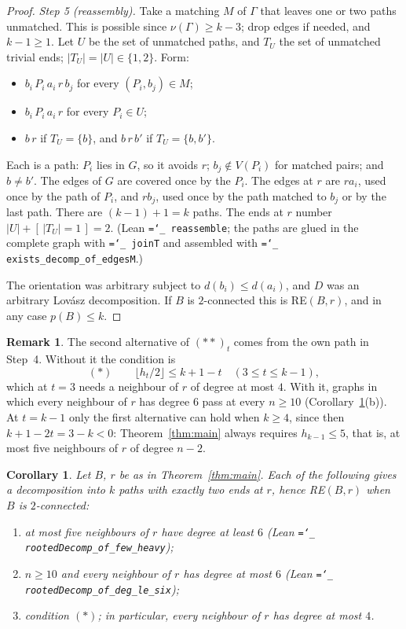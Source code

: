 \documentclass[11pt]{amsart}
\newtheorem{corollary}[theorem]{Corollary}
\theoremstyle{definition}
\newtheorem{remark}[theorem]{Remark}
\newcommand{\lean}[1]{\texttt{\hyphenchar\font=`\_ #1}}
\begin{document}
\begin{proof}
\emph{Step 5 (reassembly).} Take a matching $M$ of $\Gamma$ that leaves one or two paths unmatched.
This is possible since $\nu(\Gamma)\ge k-3$; drop edges if needed, and $k-1\ge1$. Let $U$ be the set of
unmatched paths, and $T_U$ the set of unmatched trivial ends; $|T_U|=|U|\in\{1,2\}$. Form:
\begin{itemize}[leftmargin=*]
\item $b_i\,P_i\,a_i\,r\,b_j$ for every $(P_i,b_j)\in M$;
\item $b_i\,P_i\,a_i\,r$ for every $P_i\in U$;
\item $b\,r$ if $T_U=\{b\}$, and $b\,r\,b'$ if $T_U=\{b,b'\}$.
\end{itemize}
Each is a path: $P_i$ lies in $G$, so it avoids $r$; $b_j\notin V(P_i)$ for matched pairs; and $b\ne b'$.
The edges of $G$ are covered once by the $P_i$. The edges at $r$ are $ra_i$, used once by the path of
$P_i$, and $rb_j$, used once by the path matched to $b_j$ or by the last path. There are
$(k-1)+1=k$ paths. The ends at $r$ number $|U|+[\,|T_U|=1\,]=2$. (Lean \lean{reassemble}; the paths are
glued in the complete graph with \lean{joinT} and assembled with \lean{exists\_decomp\_of\_edgesM}.)

The orientation was arbitrary subject to $d(b_i)\le d(a_i)$, and $D$ was an arbitrary Lov\'asz
decomposition. If $B$ is $2$-connected this is RE$(B,r)$, and in any case $p(B)\le k$.
\end{proof}

\begin{remark}
The second alternative of $(\ast\ast)_t$ comes from the own path in Step~4. Without it the condition
is
\[
(\ast)\qquad \lfloor h_t/2\rfloor\le k+1-t\quad(3\le t\le k-1),
\]
which at $t=3$ needs a neighbour of $r$ of degree at most $4$. With it, graphs in which every neighbour
of $r$ has degree $6$ pass at every $n\ge10$ (Corollary~\ref{cor:main}(b)).
At $t=k-1$ only the first alternative can hold when $k\ge4$, since then $k+1-2t=3-k<0$:
Theorem~\ref{thm:main} always requires $h_{k-1}\le5$, that is, at most five neighbours of $r$ of degree
$n-2$.
\end{remark}

\begin{corollary}\label{cor:main}
Let $B$, $r$ be as in Theorem~\ref{thm:main}. Each of the following gives a decomposition into $k$
paths with exactly two ends at $r$, hence RE$(B,r)$ when $B$ is $2$-connected:
\begin{enumerate}[label=(\alph*)]
\item at most five neighbours of $r$ have degree at least $6$ (Lean \lean{rootedDecomp\_of\_few\_heavy});
\item $n\ge 10$ and every neighbour of $r$ has degree at most $6$ (Lean
\lean{rootedDecomp\_of\_deg\_le\_six});
\item condition $(\ast)$; in particular, every neighbour of $r$ has degree at most $4$.
\end{enumerate}
\end{corollary}
\end{document}
